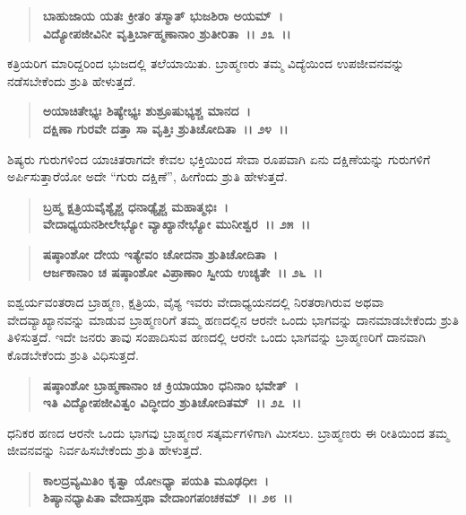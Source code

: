 \begin{verse}
\textbf{ಬಾಹುಜಾಯ ಯತಃ ಕ್ರೀತಂ ತಸ್ಮಾತ್ ಭುಜಶಿರಾ ಅಯಮ್~।}\\\textbf{ವಿದ್ಯೋಪಜೀವಿನೀ ವೃತ್ತಿರ್ಬಾಹ್ಮಣಾನಾಂ ಶ್ರುತೀರಿತಾ~।। ೨೩~।।}
\end{verse}

ಕತ್ರಿಯರಿಗ ಮಾರಿದ್ದರಿಂದ ಭುಜದಲ್ಲಿ ತಲೆಯಾಯಿತು. ಬ್ರಾಹ್ಮಣರು ತಮ್ಮ ವಿದ್ಯೆಯಿಂದ ಉಪಜೀವನವನ್ನು ನಡೆಸಬೇಕೆಂದು ಶ್ರುತಿ ಹೇಳುತ್ತದೆ.

\begin{verse}
\textbf{ಅಯಾಚಿತೇಭ್ಯಃ ಶಿಷ್ಯೇಭ್ಯಃ ಶುಶ್ರೂಷುಭ್ಯಶ್ಚ ಮಾನದ~।}\\\textbf{ದಕ್ಷಿಣಾ ಗುರವೇ ದತ್ತಾ ಸಾ ವೃತ್ತಿಃ ಶ್ರುತಿಚೋದಿತಾ~।। ೨೪~।।}
\end{verse}

ಶಿಷ್ಯರು ಗುರುಗಳಿಂದ ಯಾಚಿತರಾಗದೇ ಕೇವಲ ಭಕ್ತಿಯಿಂದ ಸೇವಾ ರೂಪವಾಗಿ ಏನು ದಕ್ಷಿಣೆಯನ್ನು ಗುರುಗಳಿಗೆ ಅರ್ಪಿಸುತ್ತಾರೆಯೋ ಅದೇ “ಗುರು ದಕ್ಷಿಣೆ”, ಹೀಗೆಂದು ಶ್ರುತಿ ಹೇಳುತ್ತದೆ.

\begin{verse}
\textbf{ಬ್ರಹ್ಮ ಕ್ಷತ್ರಿಯವೈಶ್ಯೈಶ್ಚ ಧನಾಢ್ಯೈಶ್ಚ ಮಹಾತ್ಮಭಿಃ~।}\\\textbf{ವೇದಾಧ್ಯಯನಶೀಲೇಭ್ಯೋ ವ್ಯಾಖ್ಯಾನೇಭ್ಯೋ ಮುನೀಶ್ವರ~।। ೨೫~।।} 
\end{verse}

\begin{verse}
\textbf{ಷಷ್ಠಾಂಶೋ ದೇಯ ಇತ್ಯೇವಂ ಚೋದನಾ ಶ್ರುತಿಚೋದಿತಾ~।}\\\textbf{ಆರ್ಜಕಾನಾಂ ಚ ಷಷ್ಠಾಂಶೋ ವಿಪ್ರಾಣಾಂ ಸ್ವೀಯ ಉಚ್ಯತೇ~।। ೨೬~।।}
\end{verse}

ಐಶ್ವರ್ಯವಂತರಾದ ಬ್ರಾಹ್ಮಣ, ಕ್ಷತ್ರಿಯ, ವೈಶ್ಯ ಇವರು ವೇದಾಧ್ಯಯನದಲ್ಲಿ ನಿರತ\-ರಾಗಿರುವ ಅಥವಾ ವೇದವ್ಯಾಖ್ಯಾನವನ್ನು ಮಾಡುವ ಬ್ರಾಹ್ಮಣರಿಗೆ ತಮ್ಮ ಹಣದಲ್ಲಿನ ಆರನೇ ಒಂದು ಭಾಗವನ್ನು ದಾನಮಾಡಬೇಕೆಂದು ಶ್ರುತಿ ತಿಳಿಸುತ್ತದೆ. ಇದೇ ಜನರು ತಾವು ಸಂಪಾದಿಸುವ ಹಣದಲ್ಲಿ ಆರನೇ ಒಂದು ಭಾಗವನ್ನು ಬ್ರಾಹ್ಮಣರಿಗೆ ದಾನವಾಗಿ ಕೊಡಬೇಕೆಂದು ಶ್ರುತಿ ವಿಧಿಸುತ್ತದೆ.

\begin{verse}
\textbf{ಷಷ್ಠಾಂಶೋ ಬ್ರಾಹ್ಮಣಾನಾಂ ಚ ಕ್ರಿಯಾಯಾಂ ಧನಿನಾಂ ಭವೇತ್~।}\\\textbf{ಇತಿ ವಿದ್ಯೋಪಜೀವಿತ್ವಂ ವಿದ್ಧೀದಂ ಶ್ರುತಿಚೋದಿತಮ್~।। ೨೭~।।}
\end{verse}

ಧನಿಕರ ಹಣದ ಆರನೇ ಒಂದು ಭಾಗವು ಬ್ರಾಹ್ಮಣರ ಸತ್ಕರ್ಮಗಳಿಗಾಗಿ ಮೀಸಲು. ಬ್ರಾಹ್ಮಣರು ಈ ರೀತಿಯಿಂದ ತಮ್ಮ ಜೀವನವನ್ನು ನಿರ್ವಹಿಸಬೇಕೆಂದು ಶ್ರುತಿ ಹೇಳುತ್ತದೆ.

\begin{verse}
\textbf{ಕಾಲದ್ರವ್ಯಮಿತಿಂ ಕೃತ್ವಾ ಯೋsಧ್ಯಾ ಪಯತಿ ಮೂಢಧೀಃ~।}\\\textbf{ಶಿಷ್ಯಾನಧ್ಯಾಪಿತಾ ವೇದಾಸ್ತಥಾ ವೇದಾಂಗಪಂಚಕಮ್~।। ೨೮~।।}
\end{verse}


